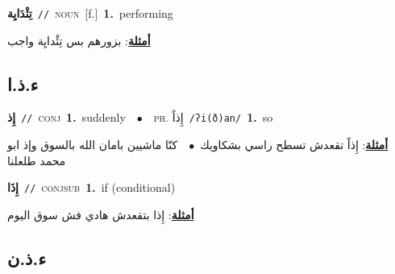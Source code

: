 \documentclass[10pt,a4paper,twoside]{article} %
\begin{document}
\begin{multicols}{2}
{{{{{{{{{{{{\setlength\topsep{0pt}\textbf{\foreignlanguage{arabic}{تِئْدَايِة}}\ {\color{gray}\texttt{//}\color{black}}\ \textsc{noun}\ [f.]\ \textbf{1.}~performing\  \begin{flushright}\color{gray}\foreignlanguage{arabic}{\textbf{\underline{\foreignlanguage{arabic}{أمثلة}}}: بزورهم بس تِئْدايِة واجب}\end{flushright}\color{black}} \vspace{2mm}

\vspace{-3mm}
\subsection*{\color{blue}\foreignlanguage{arabic}{ء.ذ.ا}\color{blue}{}} 

{\setlength\topsep{0pt}\textbf{\foreignlanguage{arabic}{إِذ}}\ {\color{gray}\texttt{//}\color{black}}\ \textsc{conj}\ \textbf{1.}~suddenly\ \ $\bullet$\ \ \textsc{ph.} \color{gray} \foreignlanguage{arabic}{إِذاً}\color{black}\ {\color{gray}\texttt{/{\sffamily ʔi(ð)an}/}\color{black}}\ \textbf{1.}~so\  \begin{flushright}\color{gray}\foreignlanguage{arabic}{\textbf{\underline{\foreignlanguage{arabic}{أمثلة}}}: إِذاً تقعدش تسطح راسي بشكاويك\ $\bullet$\ \  كنّا ماشيين بامان الله بالسوق وإذ ابو محمد طلعلنا}\end{flushright}\color{black}} \vspace{2mm}

{\setlength\topsep{0pt}\textbf{\foreignlanguage{arabic}{إِذَا}}\ {\color{gray}\texttt{//}\color{black}}\ \textsc{conj\textunderscore sub}\ \textbf{1.}~if (conditional)\  \begin{flushright}\color{gray}\foreignlanguage{arabic}{\textbf{\underline{\foreignlanguage{arabic}{أمثلة}}}: إِذا بتقعدش هادي فش سوق اليوم}\end{flushright}\color{black}} \vspace{2mm}

\vspace{-3mm}
\subsection*{\color{blue}\foreignlanguage{arabic}{ء.ذ.ن}\color{blue}{}} 

}}}}}}}}}}}
\end{multicols}
\end{document}
